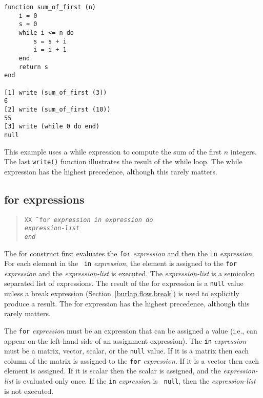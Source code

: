 \begin{screen}
\begin{verbatim}
function sum_of_first (n)
    i = 0
    s = 0
    while i <= n do
        s = s + i
        i = i + 1
    end
    return s
end

[1] write (sum_of_first (3))
6
[2] write (sum_of_first (10))
55
[3] write (while 0 do end)
null
\end{verbatim}
\end{screen}

This example uses a {\sc while} expression to compute the sum of the
first $n$ integers.  The last {\tt write()} function illustrates the
result of the {\sc while} loop.  The {\sc while} expression has the
highest precedence, although this rarely matters.



\subsection{{\sc for} expressions}
\label{burlap.flow.for}

\begin{quote}
\begin{tabbing}
\tt XX \= \kill
\tt for \it expression \tt in \it expression \tt do \\
\> \it expression-list \\
\tt end
\end{tabbing}
\end{quote}

The {\sc for} construct first evaluates the {\tt for} {\it expression}
and then the {\tt in} {\it expression}.  For each element in the {\tt
in} {\it expression}, the element is assigned to the {\tt for} {\it
expression} and the {\it expression-list} is executed.  The {\it
expression-list} is a semicolon separated list of expressions.  The
result of the {\sc for} expression is a {\tt null} value unless a {\sc
break} expression (Section~\ref{burlap.flow.break}) is used to
explicitly produce a result.  The {\sc for} expression has the highest
precedence, although this rarely matters.

The {\tt for} {\it expression} must be an expression that can be
assigned a value (i.e., can appear on the left-hand side of an
assignment expression).  The {\tt in} {\it expression} must be a
matrix, vector, scalar, or the {\tt null} value.  If it is a matrix
then each column of the matrix is assigned to the {\tt for} {\it
expression}.  If it is a vector then each element is assigned.  If it
is scalar then the scalar is assigned, and the {\it expression-list}
is evaluated only once.  If the {\tt in} {\it expression} is {\tt
null}, then the {\it expression-list} is not executed.

